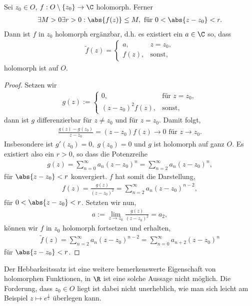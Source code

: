 \begin{prop}
\label{prop:2.39}
Sei $z_0\in O$, $f: O\setminus\{z_0\}\to \C$ holomorph.
Ferner
\begin{align*}
\exists M > 0 \exists r > 0 : \abs{f(z)} \le M, \text{ für } 0<\abs{z-z_0}<r.
\end{align*}
Dann ist $f$ in $z_0$ holomorph ergänzbar, d.h. es existiert ein $a\in\C$ so,
dass
\begin{align*}
\tilde{f}(z) = \begin{cases}
               a, & z = z_0,\\
               f(z), & \text{sonst},
               \end{cases}
\end{align*}
holomorph ist auf $O$.\fishhere
\end{prop}
\begin{proof}
Setzen wir
\begin{align*}
g(z) := 
\begin{cases}
0, & \text{für } z = z_0,\\
(z-z_0)^2f(z), &\text{sonst},
\end{cases}
\end{align*}
dann ist $g$ differenzierbar für $z\neq z_0$ und für $z=z_0$. Damit folgt,
\begin{align*}
\frac{g(z)-g(z_0)}{z-z_0} = (z-z_0)f(z) \to 0 \text{ für } z\to z_0.
\end{align*}
Insbesondere ist $g'(z_0) = 0,\; g(z_0) = 0$ und $g$ ist holomorph auf ganz $O$.
Es existiert also ein $r > 0$, so dass die Potenzreihe
\begin{align*}
g(z) = \sum\limits_{n=0}^\infty a_n(z-z_0)^n = \sum\limits_{n=2}^\infty
a_n(z-z_0)^n,
\end{align*}
für $\abs{z-z_0} < r$ konvergiert. $f$ hat somit die Darstellung,
\begin{align*}
f(z) = \frac{g(z)}{(z-z_0)^2} = \sum\limits_{n=2}^\infty a_n(z-z_0)^{n-2},
\end{align*}
für $0 < \abs{z-z_0} <r$. Setzten wir nun,
\begin{align*}
a := \lim\limits_{z\to z_0} \frac{g(z)}{(z-z_0)^2} = a_2,
\end{align*}
können wir $f$ in $z_0$ holomorph fortsetzen und erhalten,
\begin{align*}
\tilde{f}(z) = \sum\limits_{n=2}^\infty a_n(z-z_0)^{n-2}
= \sum\limits_{n=0}^\infty a_{n+2}(z-z_0)^{n}
\end{align*}
für $\abs{z-z_0}<r$.\qedhere
\end{proof}
Der Hebbarkeitssatz ist eine weitere bemerkenswerte Eigenschaft von
holomorphen Funktionen, in $\R$ ist eine solche Aussage nicht möglich.
Die Forderung, dass $z_0\in O$ liegt ist dabei nicht
unerheblich, wie man sich leicht am Beispiel $z\mapsto e^{\frac{1}{z}}$
überlegen kann.

